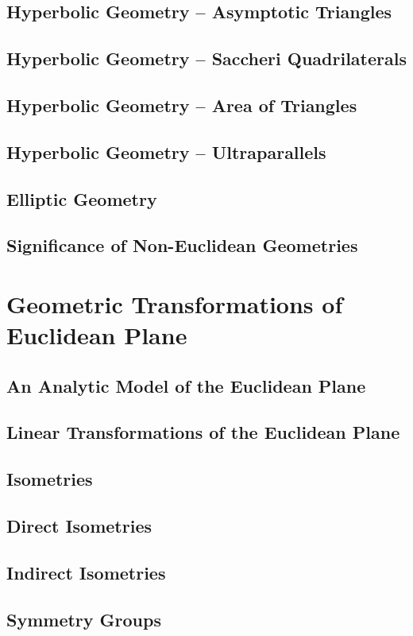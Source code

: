 \documentclass[12pt]{book}
\begin{document}
\section{Hyperbolic Geometry -- Asymptotic Triangles}
\section{Hyperbolic Geometry -- Saccheri Quadrilaterals}
\section{Hyperbolic Geometry -- Area of Triangles}
\section{Hyperbolic Geometry -- Ultraparallels}
\section{Elliptic Geometry}
\section{Significance of Non-Euclidean Geometries}

\chapter{Geometric Transformations of Euclidean Plane}
\section{An Analytic Model of the Euclidean Plane}
\section{Linear Transformations of the Euclidean Plane}
\section{Isometries}
\section{Direct Isometries}
\section{Indirect Isometries}
\section{Symmetry Groups}
\end{document}
